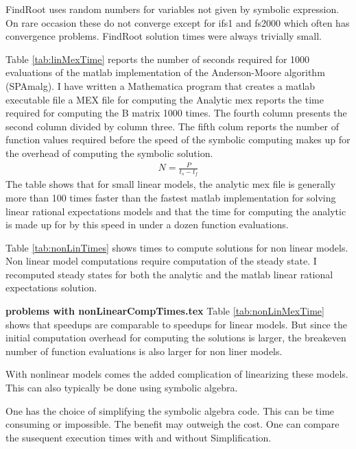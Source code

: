 \documentclass[12pt]{article}
\begin{document}
FindRoot uses random numbers for variables not given by symbolic expression.
On rare occasion these do not converge except for ifs1 and fs2000
 which often has convergence problems. 
FindRoot solution times were always trivially small.



Table \ref{tab:linMexTime} reports the number of seconds required for 1000 evaluations of
the matlab implementation of the Anderson-Moore algorithm (SPAmalg).
I have written a Mathematica program that creates a matlab executable file
a MEX file for computing the
Analytic mex reports the time required for computing the B matrix 1000 times.
The fourth column presents  the second column  divided by column three.
The fifth colum reports 
the number of function values required before the speed of the
symbolic computing makes up for the overhead of
computing the symbolic solution.
\begin{gather*}
  N=\frac{P}{t_s-t_f}
\end{gather*}
The table shows that for small linear models, 
the analytic mex file is generally more than 100 times
faster than the fastest matlab implementation for solving linear rational
expectations models and that the time for computing the analytic is
made up for by this speed in under a dozen function evaluations.





Table \ref{tab:nonLinTimes} shows times to compute solutions for non linear
models. Non linear model computations require computation of the steady state.
I recomputed steady states for both the analytic and the matlab linear 
rational expectations solution.




{\bf problems with {nonLinearCompTimes.tex}}
Table \ref{tab:nonLinMexTime} shows that
speedups are comparable to speedups for linear models. But since the 
initial computation overhead for computing the solutions is larger, the
breakeven number of function evaluations is also larger for non liner models.

    
With nonlinear models comes the added complication of linearizing these models.
This can also typically be done using symbolic algebra.

One has the choice of simplifying the symbolic algebra code. This can be
time consuming or impossible.  The benefit may outweigh the cost.
One can compare the susequent execution times with and without Simplification.
\end{document}

